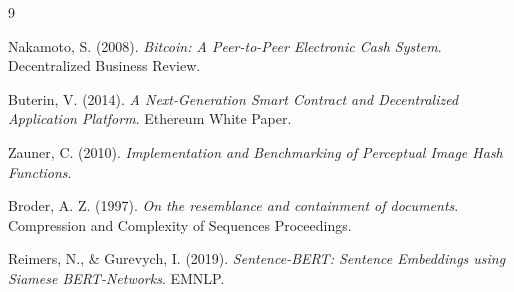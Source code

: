 \documentclass[12pt,a4paper]{report}
\begin{document}
\begin{thebibliography}{9}

Nakamoto, S. (2008). \textit{Bitcoin: A Peer-to-Peer Electronic Cash System}. Decentralized Business Review.

Buterin, V. (2014). \textit{A Next-Generation Smart Contract and Decentralized Application Platform}. Ethereum White Paper.

Zauner, C. (2010). \textit{Implementation and Benchmarking of Perceptual Image Hash Functions}.

Broder, A. Z. (1997). \textit{On the resemblance and containment of documents}. Compression and Complexity of Sequences Proceedings.

Reimers, N., \& Gurevych, I. (2019). \textit{Sentence-BERT: Sentence Embeddings using Siamese BERT-Networks}. EMNLP.

\end{thebibliography}
\end{document}
